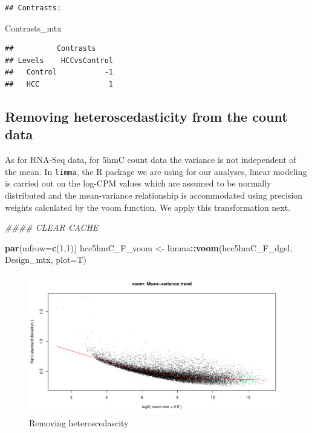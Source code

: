 \documentclass[
]{book}
\newenvironment{Shaded}{\begin{snugshade}}{\end{snugshade}}
\newcommand{\CommentTok}[1]{\textcolor[rgb]{0.56,0.35,0.01}{\textit{#1}}}
\newcommand{\DataTypeTok}[1]{\textcolor[rgb]{0.13,0.29,0.53}{#1}}
\newcommand{\DecValTok}[1]{\textcolor[rgb]{0.00,0.00,0.81}{#1}}
\newcommand{\KeywordTok}[1]{\textcolor[rgb]{0.13,0.29,0.53}{\textbf{#1}}}
\newcommand{\NormalTok}[1]{#1}
\newcommand{\OperatorTok}[1]{\textcolor[rgb]{0.81,0.36,0.00}{\textbf{#1}}}
\newcommand{\StringTok}[1]{\textcolor[rgb]{0.31,0.60,0.02}{#1}}
\begin{document}
\begin{verbatim}
## Contrasts:
\end{verbatim}

\begin{Shaded}
\begin{Highlighting}[]
\NormalTok{Contrasts\_mtx}
\end{Highlighting}
\end{Shaded}

\begin{verbatim}
##          Contrasts
## Levels    HCCvsControl
##   Control           -1
##   HCC                1
\end{verbatim}

\hypertarget{removing-heteroscedasticity-from-the-count-data}{%
\subsection*{Removing heteroscedasticity from the count data}\label{removing-heteroscedasticity-from-the-count-data}}

As for RNA-Seq data, for 5hmC count data the variance is not independent of the mean.
In \texttt{limma}, the R package we are using for our analyses,
linear modeling is carried out on the log-CPM values which are assumed to be
normally distributed and the mean-variance relationship is accommodated using precision
weights calculated by the voom function. We apply this transformation next.

\begin{Shaded}
\begin{Highlighting}[]
\CommentTok{\#\#\#\# CLEAR CACHE}

\KeywordTok{par}\NormalTok{(}\DataTypeTok{mfrow=}\KeywordTok{c}\NormalTok{(}\DecValTok{1}\NormalTok{,}\DecValTok{1}\NormalTok{))}
\NormalTok{hcc5hmC\_F\_voom <{-}}\StringTok{ }\NormalTok{limma}\OperatorTok{::}\KeywordTok{voom}\NormalTok{(hcc5hmC\_F\_dgel, Design\_mtx, }\DataTypeTok{plot=}\NormalTok{T)}
\end{Highlighting}
\end{Shaded}

\begin{figure}
\centering
\includegraphics{Static/figures/hcc5hmC-preproc-Voom1-1.pdf}
\caption{\label{fig:hcc5hmC-preproc-Voom1}Removing heteroscedascity}
\end{figure}
\end{document}

